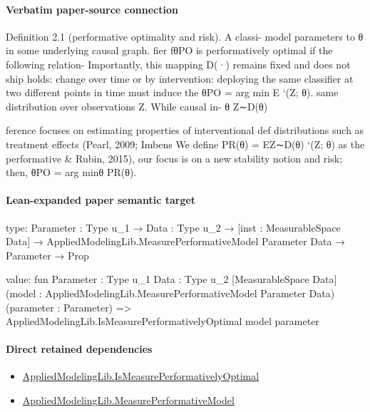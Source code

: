 \documentclass[10pt]{article}
\begin{document}
\paragraph{Verbatim paper-source connection}
\begin{ReviewVerbatim}
Deﬁnition 2.1 (performative optimality and risk). A classi-
model parameters to θ in some underlying causal graph.
                                                                  ﬁer fθPO is performatively optimal if the following relation-
Importantly, this mapping D(·) remains ﬁxed and does not
                                                                  ship holds:
change over time or by intervention: deploying the same
classiﬁer at two different points in time must induce the                       θPO = arg min      E      `(Z; θ).
same distribution over observations Z. While causal in-                                    θ     Z∼D(θ)

ference focuses on estimating properties of interventional                          def
distributions such as treatment effects (Pearl, 2009; Imbens      We deﬁne PR(θ) = EZ∼D(θ) `(Z; θ) as the performative
& Rubin, 2015), our focus is on a new stability notion and        risk; then, θPO = arg minθ PR(θ).
\end{ReviewVerbatim}



\paragraph{Lean-expanded paper semantic target}
\begin{ReviewVerbatim}
type:
{Parameter : Type u_1} →
  {Data : Type u_2} →
    [inst : MeasurableSpace Data] → AppliedModelingLib.MeasurePerformativeModel Parameter Data → Parameter → Prop

value:
fun {Parameter : Type u_1} {Data : Type u_2} [MeasurableSpace Data]
    (model : AppliedModelingLib.MeasurePerformativeModel Parameter Data) (parameter : Parameter) =>
  AppliedModelingLib.IsMeasurePerformativelyOptimal model parameter
\end{ReviewVerbatim}

\paragraph{Direct retained dependencies}
\begin{itemize}\raggedright
\item \hyperlink{governing-declaration-bf41b084ebc9aa18}{Applied\allowbreak{}Modeling\allowbreak{}Lib.\allowbreak{}Is\allowbreak{}Measure\allowbreak{}Performatively\allowbreak{}Optimal}
\item \hyperlink{library-prerequisite-96553d4fbb82f1ac}{Applied\allowbreak{}Modeling\allowbreak{}Lib.\allowbreak{}Measure\allowbreak{}Performative\allowbreak{}Model}
\end{itemize}
\end{document}
